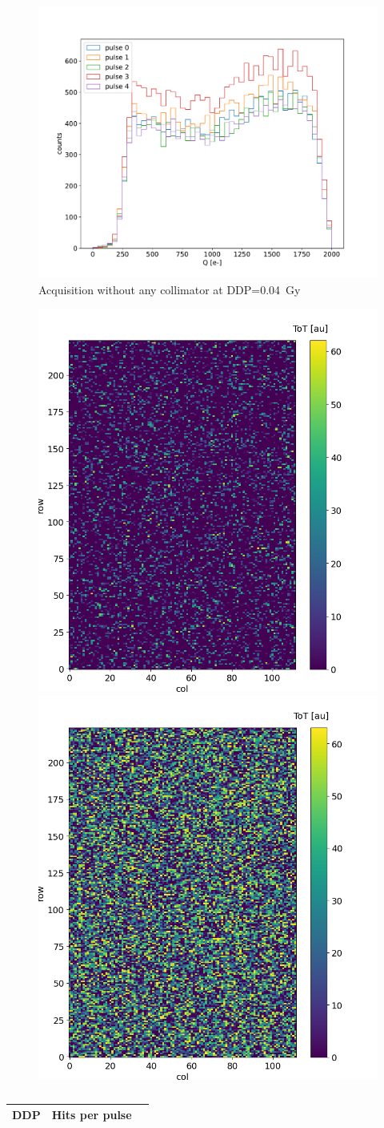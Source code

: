    \begin{figure}
      \centering
      \includegraphics[width=.7\linewidth]{figures/test_beam/Qe_17_32.pdf}
      \caption{Acquisition without any collimator at DDP=\SI{0.04}{Gy}}
      \label{fig:}
   \end{figure}



   \begin{figure}
      \centering
      \includegraphics[width=.49\linewidth]{figures/test_beam/tot_mapq1_15-57.png}
      \includegraphics[width=.49\linewidth]{figures/test_beam/tot_mapq2_15-57.png}  
      \caption{}
      \label{fig:}
   \end{figure}

   \begin{table}
      \begin{center}
      \begin{tabular}{| c | c | c |}
      \hline
      DDP & Hits per pulse &    \\
      \hline
      \hline



      \end{tabular}
      \caption{}
      \label{tab:}
      \end{center}
   \end{table}   


